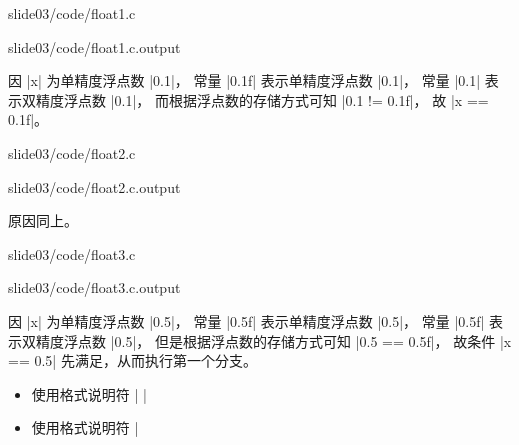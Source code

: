\begin{frame}[fragile]
  
  {slide03/code/float1.c}
\pause 

  
  {slide03/code/float1.c.output}
  \pause
  
  \begin{free}[解释]
    因 \lst|x| 为单精度浮点数 \lst|0.1|，
    常量 \lst|0.1f| 表示单精度浮点数 \lst|0.1|，
    常量 \lst|0.1| 表示双精度浮点数 \lst|0.1|，
    而根据浮点数的存储方式可知 \lst|0.1 != 0.1f|，
    故 \lst|x == 0.1f|。
\end{free}
\end{frame}

\begin{frame}[fragile]
  
  {slide03/code/float2.c}
  \pause 

  
  {slide03/code/float2.c.output}
  \pause
  
  \begin{free}[解释]{}
    原因同上。
  \end{free}
\end{frame}


\begin{frame}[fragile]
  
  {slide03/code/float3.c}
  \pause
  
  
  {slide03/code/float3.c.output}
  \pause


  \begin{free}[解释]{}
    因 \lst|x| 为单精度浮点数 \lst|0.5|，
    常量 \lst|0.5f| 表示单精度浮点数 \lst|0.5|，
    常量 \lst|0.5f| 表示双精度浮点数 \lst|0.5|，
    但是根据浮点数的存储方式可知 \lst|0.5 == 0.5f|，
    故条件 \lst|x == 0.5| 先满足，从而执行第一个分支。
  \end{free}
\end{frame}

\begin{frame}[fragile]
\begin{itemize}
\item 使用格式说明符 \lst|%
  \lst|%
\item 使用格式说明符 \lst|%
\end{itemize}
\end{frame}

